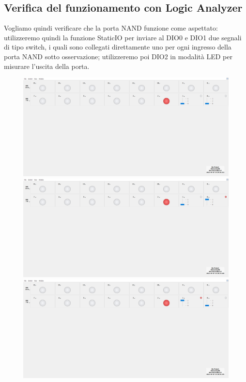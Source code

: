 \documentclass[10pt, a4paper, italian]{article}
\begin{document}
\subsection{Verifica del funzionamento con Logic Analyzer}
Vogliamo quindi verificare che la porta NAND funzione come aspettato: utilizzeremo quindi la funzione StaticIO per inviare al DIO0 e DIO1 due segnali di tipo switch, i quali sono collegati direttamente uno per ogni ingresso della porta NAND sotto osservazione; utilizzeremo poi DIO2 in modalità LED per misurare l'uscita della porta.
\begin{figure}[htbp]
	\includegraphics[scale=0.21]{static_nand00}
	\includegraphics[scale=0.21]{static_nand01}
	\includegraphics[scale=0.21]{static_nand10}

\end{figure}
\end{document}
